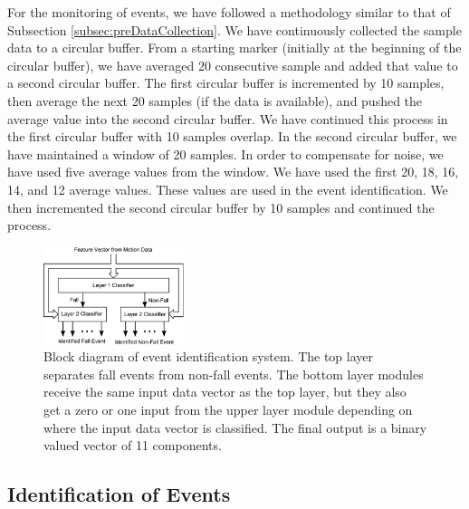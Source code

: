 \documentclass[]{IEEEtran}
\begin{document}
For the monitoring of events, we have followed a methodology similar to that of
Subsection \ref{subsec:preDataCollection}. We have continuously collected the
sample data to a circular buffer. From a starting marker (initially at the
beginning of the circular buffer), we have averaged 20 consecutive sample and
added that value to a second circular buffer. The first circular buffer is
incremented by 10 samples, then average the next 20 samples (if the data is
available), and pushed  the average value into the second circular buffer. We
have continued this process in the first circular buffer with 10 samples
overlap. In the second circular buffer, we have maintained a window of 20
samples.  In order to compensate for noise, we have used five average values
from the window. We have used the first 20, 18, 16, 14, and 12 average values.
These  values are used in the event identification. We then incremented the
second circular buffer by 10 samples and continued the process.  

\begin{figure}[!tbh]
	\centering
		\includegraphics[width=0.365\textwidth]{figures/TrainedIdentificationModule.eps}
	\caption{Block diagram of event identification system. The top layer
separates fall events from non-fall events. The bottom layer modules receive
the same input data vector as the top layer, but they also get a zero or one
input from the upper layer module depending on where the input data vector is
classified. The final output is a binary valued vector of 11 components.}
\label{fig:TrainedIdentificationModule}
\end{figure}


\subsection{Identification of Events}
\end{document}
